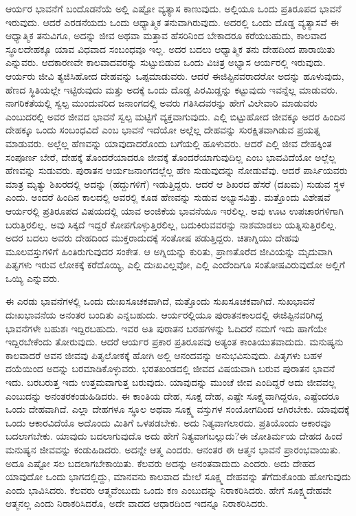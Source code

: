 ಆರ್ಯರ ಭಾವನೆಗೆ ಬಂದೊಡನೆಯೆ ಅಲ್ಲಿ ಎಷ್ಟೋ ವ್ಯತ್ಯಾಸ ಕಾಣುವುದು. ಅಲ್ಲಿಯೂ ಒಂದು ಪ್ರತಿರೂಪದ ಭಾವನೆ ಇರುವುದು. ಆದರೆ ಎರಡನೆಯದು ಒಂದು ಆಧ್ಯಾತ್ಮಿಕ ತನುವಾಗಿರುವುದು. ಅದರಲ್ಲಿ ಒಂದು ದೊಡ್ಡ ವ್ಯತ್ಯಾಸವೆ ಈ ಆಧ್ಯಾತ್ಮಿಕ ತನುವಿಗೂ, ಅದನ್ನು ಜೀವ ಅಥವಾ ಮತ್ತಾವ ಹೆಸರಿನಿಂದ ಬೇಕಾದರೂ ಕರೆಯಬಹುದು, ಕಾಲವಾದ ಸ್ಥೂಲದೇಹಕ್ಕೂ ಯಾವ ವಿಧವಾದ ಸಂಬಂಧವೂ ಇಲ್ಲ. ಅದರ ಬದಲು ಆಧ್ಯಾತ್ಮಿಕ ತನು ದೇಹದಿಂದ ಪಾರಾಯಿತು ಎನ್ನುವರು. ಆದಕಾರಣವೇ ಕಾಲವಾದವರನ್ನು ಸುಟ್ಟುಬಿಡುವ ಒಂದು ವಿಚಿತ್ರ ಅಭ್ಯಾಸ ಆರ್ಯರಲ್ಲಿ ಇರುವುದು. ಆರ್ಯರು ಜೀವಿ ತ್ಯಜಿಸಿಹೋದ ದೇಹವನ್ನು ಒಪ್ಪಮಾಡುವರು. ಆದರೆ ಈಜಿಪ್ಟಿನವರಾದರೋ ಅದನ್ನು ಹೂಳುವುದು, ಹೆಣದ ಸ್ಥಿತಿಯಲ್ಲೇ ಇಟ್ಟಿರುವುದು ಮತ್ತು ಅದಕ್ಕೆ ಒಂದು ದೊಡ್ಡ ಪಿರಮಿಡ್ಡನ್ನು ಕಟ್ಟುವುದು ಇವನ್ನೆಲ್ಲ ಮಾಡುವರು. ನಾಗರಿಕತೆಯಲ್ಲಿ ಸ್ವಲ್ಪ ಮುಂದುವರಿದ ಜನಾಂಗದಲ್ಲಿ ಅವರು ಗತಿಸಿದವರನ್ನು ಹೇಗೆ ವಿಲೇವಾರಿ ಮಾಡುವರು ಎಂಬುದರಲ್ಲಿ ಅವರ ಜೀವದ ಭಾವನೆ ಸ್ವಲ್ಪ ಮಟ್ಟಿಗೆ ವ್ಯಕ್ತವಾಗುವುದು. ಎಲ್ಲಿ ಬಿಟ್ಟುಹೋದ ಜೀವಕ್ಕೂ ಅದರ ಹಿಂದಿನ ದೇಹಕ್ಕೂ ಒಂದು ಸಂಬಂಧವಿದೆ ಎಂಬ ಭಾವನೆ ಇದೆಯೋ ಅಲ್ಲೆಲ್ಲ ದೇಹವನ್ನು ಸುರಕ್ಷಿತವಾಗಿಡುವ ಪ್ರಯತ್ನ ಮಾಡುವರು. ಅಲ್ಲೆಲ್ಲ ಹೆಣವನ್ನು ಯಾವುದಾದರೊಂದು ಬಗೆಯಲ್ಲಿ ಹೂಳುವರು. ಆದರೆ ಎಲ್ಲಿ ಜೀವ ದೇಹಕ್ಕಿಂತ ಸಂಪೂರ್ಣ ಬೇರೆ, ದೇಹಕ್ಕೆ ತೊಂದರೆಯಾದರೂ ಜೀವಕ್ಕೆ ತೊಂದರೆಯಾಗುವುದಿಲ್ಲ ಎಂಬ ಭಾವವಿದೆಯೋ ಅಲ್ಲೆಲ್ಲ ಹೆಣವನ್ನು ಸುಡುವರು. ಪುರಾತನ ಆರ್ಯಜನಾಂಗದಲ್ಲೆಲ್ಲ ಹೆಣ ಸುಡುವುದನ್ನು ನೋಡುವೆವು. ಆದರೆ ಪಾರ್ಸಿಯವರು ಮಾತ್ರ ಮೃತ್ಯು ಶಿಖರದಲ್ಲಿ ಅದನ್ನು (ಹದ್ದುಗಳಿಗೆ) ಇಡುತ್ತಿದ್ದರು. ಆದರೆ ಆ ಶಿಖರದ ಹೆಸರೆ (ದಖಮ) ಸುಡುವ ಸ್ಥಳ ಎಂದು. ಅಂದರೆ ಹಿಂದಿನ ಕಾಲದಲ್ಲಿ ಅವರಲ್ಲಿ ಕೂಡ ಹೆಣವನ್ನು ಸುಡುವ ಅಭ್ಯಾಸವಿತ್ತು. ಮತ್ತೊಂದು ವಿಶೇಷವೆ ಆರ್ಯರಲ್ಲಿ ಪ್ರತಿರೂಪದ ವಿಷಯದಲ್ಲಿ ಯಾವ ಅಂಜಿಕೆಯ ಭಾವನೆಯೂ ಇರಲಿಲ್ಲ. ಅವು ಊಟ ಉಪಚಾರಗಳಿಗಾಗಿ ಬರುತ್ತಿರಲಿಲ್ಲ. ಅವು ಸಿಕ್ಕದೆ ಇದ್ದರೆ ಕೋಪಗೊಳ್ಳುತ್ತಿರಲಿಲ್ಲ, ಬದುಕಿರುವವರನ್ನು ನಾಶಮಾಡಲು ಯತ್ನಿಸುತ್ತಿರಲಿಲ್ಲ. ಅದರ ಬದಲು ಅವರು ದೇಹದಿಂದ ಮುಕ್ತರಾದುದಕ್ಕೆ ಸಂತೋಷ ಪಡುತ್ತಿದ್ದರು. ಚಿತಾಗ್ನಿಯು ದೇಹವು ಮೂಲವಸ್ತುಗಳಿಗೆ ಹಿಂತಿರುಗುವುದರ ಸಂಕೇತ. ಆ ಅಗ್ನಿಯನ್ನು ಕುರಿತು, ಪ್ರಾಣತೊರೆದ ಜೀವಿಯನ್ನು ಮೃದುವಾಗಿ ಪಿತೃಗಳು ಇರುವ ಲೋಕಕ್ಕೆ ಕರೆದೊಯ್ಯಿ, ಎಲ್ಲಿ ದುಃಖವಿಲ್ಲವೋ, ಎಲ್ಲಿ ಎಂದೆಂದಿಗೂ ಸಂತೋಷವಿರುವುದೋ ಅಲ್ಲಿಗೆ ಒಯ್ಯಿ ಎನ್ನುವರು.

ಈ ಎರಡು ಭಾವನೆಗಳಲ್ಲಿ ಒಂದು ದುಃಖಸೂಚಕವಾಗಿದೆ, ಮತ್ತೊಂದು ಸುಖಸೂಚಕವಾಗಿದೆ. ಸುಖಭಾವನೆ ದುಃಖಭಾವನೆಯ ಅನಂತರ ಬಂದಿತು ಎನ್ನಬಹುದು. ಆರ್ಯರಲ್ಲಿಯೂ ಪುರಾತನಕಾಲದಲ್ಲಿ ಈಜಿಪ್ಟಿನವರಿಗಿದ್ದ ಭಾವನೆಗಳೇ ಬಹುಶಃ ಇದ್ದಿರಬಹುದು. ಇವರ ಅತಿ ಪುರಾತನ ಬರಹಗಳನ್ನು ಓದಿದರೆ ನಮಗೆ ಇದು ಹಾಗೆಯೇ ಇದ್ದಿರಬೇಕೆಂದು ತೋರುವುದು. ಆದರೆ ಆರ್ಯರ ಪ್ರಕಾರ ಪ್ರತಿರೂಪವು ಅತ್ಯಂತ ಕಾಂತಿಯುತವಾದುದು. ಮನುಷ್ಯನು ಕಾಲವಾದರೆ ಅವನ ಜೀವವು ಪಿತೃಲೋಕಕ್ಕೆ ಹೋಗಿ ಅಲ್ಲಿ ಆನಂದವನ್ನು ಅನುಭವಿಸುವುದು. ಪಿತೃಗಳು ಬಹಳ ದಯೆಯಿಂದ ಅದನ್ನು ಬರಮಾಡಿಕೊಳ್ಳುವರು. ಭರತಖಂಡದಲ್ಲಿ ಜೀವದ ವಿಷಯವಾಗಿ ಬರುವ ಪುರಾತನ ಭಾವನೆ ಇದು. ಬರಬರುತ್ತ ಇದು ಉತ್ತಮವಾಗುತ್ತ ಬರುವುದು. ಯಾವುದನ್ನು ಮುಂಚೆ ಜೀವ ಎಂದಿದ್ದರೆ ಅದು ಜೀವವಲ್ಲ ಎಂಬುದನ್ನು ಅನಂತರ\break ಕಂಡುಹಿಡಿದರು. ಈ ಕಾಂತಿಯ ದೇಹ, ಸೂಕ್ಷ ದೇಹ, ಎಷ್ಟೇ ಸೂಕ್ಷ್ಮವಾಗಿದ್ದರೂ, ಎಷ್ಟೆಂದರೂ ಒಂದು ದೇಹವಾಗಿದೆ. ಎಲ್ಲಾ ದೇಹಗಳೂ ಸ್ಥೂಲ ಅಥವಾ ಸೂಕ್ಷ್ಮ ವಸ್ತುಗಳ ಸಂಯೋಗದಿಂದ ಆಗಿರಬೇಕು. ಯಾವುದಕ್ಕೆ ಒಂದು ಆಕಾರವಿದೆಯೊ ಅದೊಂದು ಮಿತಿಗೆ ಒಳಪಡಬೇಕು. ಅದು ನಿತ್ಯವಾಗಲಾರದು. ಪ್ರತಿಯೊಂದು ಆಕಾರವೂ ಬದಲಾಗಬೇಕು. ಯಾವುದು ಬದಲಾಗುವುದೊ ಅದು ಹೇಗೆ ನಿತ್ಯವಾಗಬಲ್ಲುದು?\break ಈ ಜೋತಿರ್ಮಯ ದೇಹದ ಹಿಂದೆ ಮನುಷ್ಯನ ಜೀವವನ್ನು ಕಂಡುಹಿಡಿದರು. ಅದನ್ನೇ ಆತ್ಮ ಎಂದರು. ಆನಂತರ ಈ ಆತ್ಮನ ಭಾವನೆ ಪ್ರಾರಂಭವಾಯಿತು. ಅದೂ ಎಷ್ಟೋ ಸಲ ಬದಲಾಗಬೇಕಾಯಿತು. ಕೆಲವರು ಅದನ್ನು ಅನಂತವಾದುದು ಎಂದರು. ಅದು ದೇಹದ ಯಾವುದೋ ಒಂದು ಭಾಗದಲ್ಲಿದ್ದು, ಮಾನವನು ಕಾಲವಾದ ಮೇಲೆ ಸೂಕ್ಷ್ಮ ದೇಹವನ್ನು ತೆಗೆದುಕೊಂಡು ಹೋಗುವುದು ಎಂದು ಭಾವಿಸಿದರು. ಕೆಲವರು ಆತ್ಮವೆಂಬುದು ಒಂದು ಕಣ ಎಂಬುದನ್ನು ನಿರಾಕರಿಸಿದರು. ಹೇಗೆ ಸೂಕ್ಷ್ಮದೇಹವೇ ಆತ್ಮನಲ್ಲ ಎಂದು ನಿರಾಕರಿಸಿದರೊ, ಅದೇ ವಾದದ ಆಧಾರದಿಂದ ಇದನ್ನೂ ನಿರಾಕರಿಸಿದರು.

